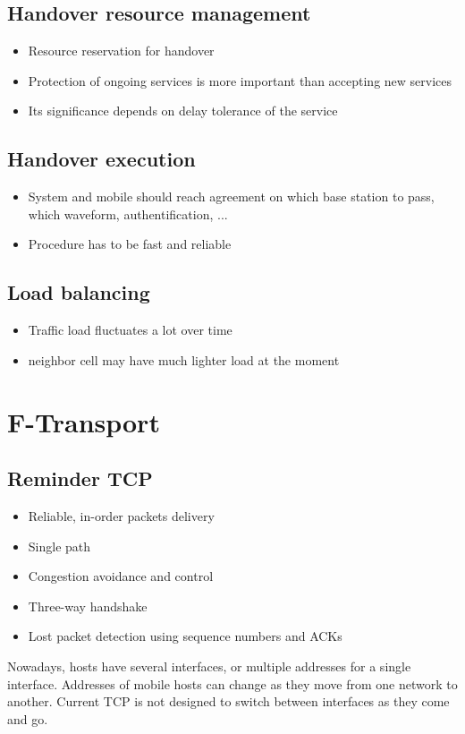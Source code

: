 \subsection{Handover resource management}
\begin{itemize}
	\item Resource reservation for handover
	\item Protection of ongoing services is more important than accepting new services
	\item Its significance depends on delay tolerance of the service
\end{itemize}
\subsection{Handover execution}
\begin{itemize}
	\item System and mobile should reach agreement on which base station to pass, which waveform, authentification, ... 
	\item Procedure has to be fast and reliable
\end{itemize}
\subsection{Load balancing}
\begin{itemize}
	\item Traffic load fluctuates a lot over time
	\item neighbor cell may have much lighter load at the moment
\end{itemize}
\section{F-Transport}
\subsection{Reminder TCP}
\begin{itemize}
	\item Reliable, in-order packets delivery
	\item Single path
	\item Congestion avoidance and control
	\item Three-way handshake
	\item Lost packet detection using sequence numbers and ACKs
\end{itemize}
Nowadays, hosts have several interfaces, or multiple addresses for a single interface. Addresses of mobile hosts can change as they move from one network to another. Current TCP is not designed to switch between interfaces as they come and go.\\

